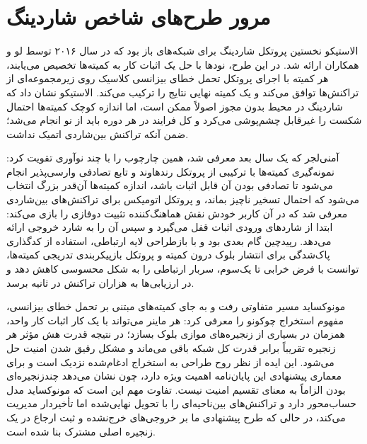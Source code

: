 \section{مرور طرح‌های شاخص شاردینگ}

الاستیکو نخستین پروتکل شاردینگ برای شبکه‌های باز بود که در سال ۲۰۱۶ توسط لو و همکاران ارائه شد. در این طرح، نودها با حل یک اثبات کار به کمیته‌ها تخصیص می‌یابند، هر کمیته با اجرای پروتکل تحمل خطای بیزانسی کلاسیک روی زیرمجموعه‌ای از تراکنش‌ها توافق می‌کند و یک کمیته نهایی نتایج را ترکیب می‌کند. الاستیکو نشان داد که شاردینگ در محیط بدون مجوز اصولاً ممکن است، اما اندازه کوچک کمیته‌ها احتمال شکست را غیرقابل چشم‌پوشی می‌کرد و کل فرایند در هر دوره باید از نو انجام می‌شد؛ ضمن آنکه تراکنش بین‌شاردی اتمیک نداشت.

آمنی‌لجر که یک سال بعد معرفی شد، همین چارچوب را با چند نوآوری تقویت کرد: نمونه‌گیری کمیته‌ها با ترکیبی از پروتکل رندهاوند و تابع تصادفی وارسی‌پذیر انجام می‌شود تا تصادفی بودن آن قابل اثبات باشد، اندازه کمیته‌ها آن‌قدر بزرگ انتخاب می‌شود که احتمال تسخیر ناچیز بماند، و پروتکل اتومیکس برای تراکنش‌های بین‌شاردی معرفی شد که در آن کاربر خودش نقش هماهنگ‌کننده تثبیت دوفازی را بازی می‌کند: ابتدا از شاردهای ورودی اثبات قفل می‌گیرد و سپس آن را به شارد خروجی ارائه می‌دهد. رپیدچین گام بعدی بود و با بازطراحی لایه ارتباطی، استفاده از کدگذاری پاک‌شدگی برای انتشار بلوک درون کمیته و پروتکل بازپیکربندی تدریجی کمیته‌ها، توانست با فرض خرابی تا یک‌سوم، سربار ارتباطی را به شکل محسوسی کاهش دهد و در ارزیابی‌ها به هزاران تراکنش در ثانیه برسد.

مونوکساید مسیر متفاوتی رفت و به جای کمیته‌های مبتنی بر تحمل خطای بیزانسی، مفهوم استخراج چوکونو را معرفی کرد: هر ماینر می‌تواند با یک کار اثبات کار واحد، همزمان در بسیاری از زنجیره‌های موازی بلوک بسازد؛ در نتیجه قدرت هش مؤثر هر زنجیره تقریباً برابر قدرت کل شبکه باقی می‌ماند و مشکل رقیق شدن امنیت حل می‌شود. این ایده از نظر روح طراحی به استخراج ادغام‌شده نزدیک است و برای معماری پیشنهادی این پایان‌نامه اهمیت ویژه دارد، چون نشان می‌دهد چندزنجیره‌ای بودن الزاماً به معنای تقسیم امنیت نیست. تفاوت مهم این است که مونوکساید مدل حساب‌محور دارد و تراکنش‌های بین‌ناحیه‌ای را با تحویل نهایی‌شده اما تأخیردار مدیریت می‌کند، در حالی که طرح پیشنهادی ما بر خروجی‌های خرج‌نشده و ثبت ارجاع در یک زنجیره اصلی مشترک بنا شده است.

